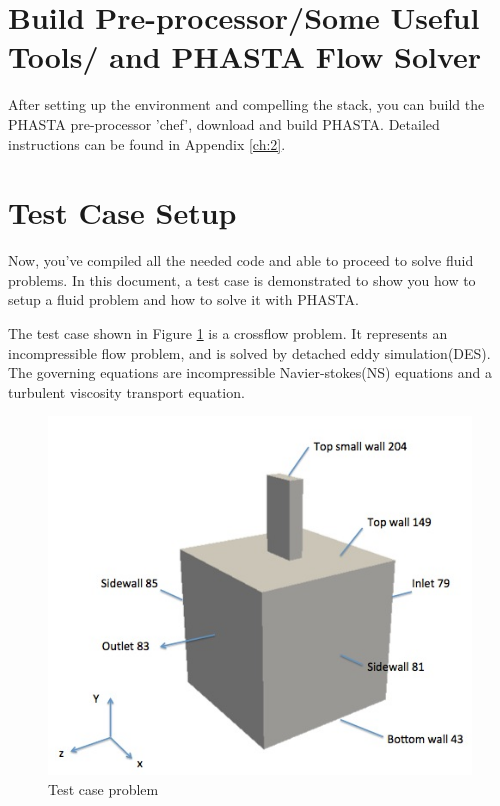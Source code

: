\documentclass{article}
\begin{document}
\section{Build Pre-processor/Some Useful Tools/ and PHASTA Flow Solver}

After setting up the environment and compelling the stack, you can build the PHASTA pre-processor 'chef', download and build PHASTA. Detailed instructions can be found in Appendix \ref{ch:2}.


\section{Test Case Setup}

Now, you've compiled all the needed code and able to proceed to solve fluid problems. In this document, a test case is demonstrated to show you how to setup a fluid problem and how to solve it with PHASTA. 

The test case shown in Figure \ref{fig:1} is a crossflow problem. It represents an incompressible flow problem, and is solved by detached eddy simulation(DES). The governing equations are incompressible Navier-stokes(NS) equations and a turbulent viscosity transport equation. 

\begin{figure}[h!]
\centering
\includegraphics[width=1\textwidth]{fig1}
\caption{Test case problem}
\label{fig:1}
\end{figure}
\end{document}

